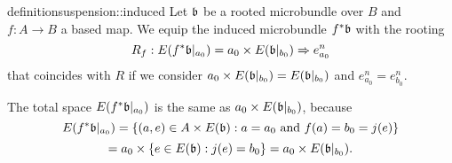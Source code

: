 \begin{mystatement}{definition}{suspension::induced}
    Let $\bb$ be a rooted microbundle over $B$ and $f: A \to B$ a based map.
    We equip the induced microbundle $\ind{f}\bb$ with the rooting
    \[
        \germdef{R_f}{E(\ind{f}\bb[a_0])
        = a_0 \cross E(\bb[b_0])}{e^n_{a_0}}
    \]
    that coincides with $R$ if we consider
    $a_0 \cross E(\bb[b_0]) = E(\bb[b_0])$ and $e^n_{a_0} = e^n_{b_0}$.
\end{mystatement}

\begin{myparagraph}
    The total space $E(\ind{f}\bb[a_0])$ is the same as $a_0 \cross E(\bbb)$, because
    \[ E(\ind{f}\bb[a_0]) = \set{(a, e) \in A \cross E(\bb)}{a = a_0 \tand f(a) = b_0 = j(e)} \]
    \[ = a_0 \cross \set{e \in E(\bb)}{j(e) = b_0} = a_0 \cross E(\bbb). \]
    
\end{myparagraph}